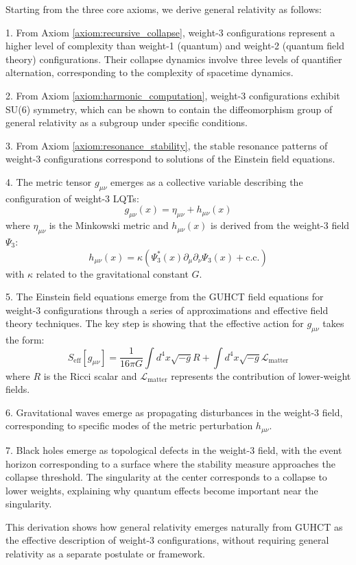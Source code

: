 \documentclass[11pt,a4paper]{article}
\makeatletter
\renewenvironment{proof}[1][\proofname]{\par
  \pushQED{\qed}%
  \normalfont \topsep6\p@\@plus6\p@\relax
  \trivlist
  \item[\hskip\labelsep
        \itshape
    #1\@addpunct{.}]\ignorespaces
}{%
  \popQED\endtrivlist\@endpefalse
}
\makeatother
\begin{document}
\begin{proof}
Starting from the three core axioms, we derive general relativity as follows:

1. From Axiom \ref{axiom:recursive_collapse}, weight-3 configurations represent a higher level of complexity than weight-1 (quantum) and weight-2 (quantum field theory) configurations. Their collapse dynamics involve three levels of quantifier alternation, corresponding to the complexity of spacetime dynamics.

2. From Axiom \ref{axiom:harmonic_computation}, weight-3 configurations exhibit SU(6) symmetry, which can be shown to contain the diffeomorphism group of general relativity as a subgroup under specific conditions.

3. From Axiom \ref{axiom:resonance_stability}, the stable resonance patterns of weight-3 configurations correspond to solutions of the Einstein field equations.

4. The metric tensor $g_{\mu\nu}$ emerges as a collective variable describing the configuration of weight-3 LQTs:
   \begin{equation}
   g_{\mu\nu}(x) = \eta_{\mu\nu} + h_{\mu\nu}(x)
   \end{equation}
   where $\eta_{\mu\nu}$ is the Minkowski metric and $h_{\mu\nu}(x)$ is derived from the weight-3 field $\Psi_3$:
   \begin{equation}
   h_{\mu\nu}(x) = \kappa \left(\Psi_3^*(x) \partial_\mu \partial_\nu \Psi_3(x) + \text{c.c.}\right)
   \end{equation}
   with $\kappa$ related to the gravitational constant $G$.

5. The Einstein field equations emerge from the GUHCT field equations for weight-3 configurations through a series of approximations and effective field theory techniques. The key step is showing that the effective action for $g_{\mu\nu}$ takes the form:
   \begin{equation}
   S_{\text{eff}}[g_{\mu\nu}] = \frac{1}{16\pi G} \int d^4x \sqrt{-g} R + \int d^4x \sqrt{-g} \mathcal{L}_{\text{matter}}
   \end{equation}
   where $R$ is the Ricci scalar and $\mathcal{L}_{\text{matter}}$ represents the contribution of lower-weight fields.

6. Gravitational waves emerge as propagating disturbances in the weight-3 field, corresponding to specific modes of the metric perturbation $h_{\mu\nu}$.

7. Black holes emerge as topological defects in the weight-3 field, with the event horizon corresponding to a surface where the stability measure approaches the collapse threshold. The singularity at the center corresponds to a collapse to lower weights, explaining why quantum effects become important near the singularity.

This derivation shows how general relativity emerges naturally from GUHCT as the effective description of weight-3 configurations, without requiring general relativity as a separate postulate or framework.
\end{proof}
\end{document}
